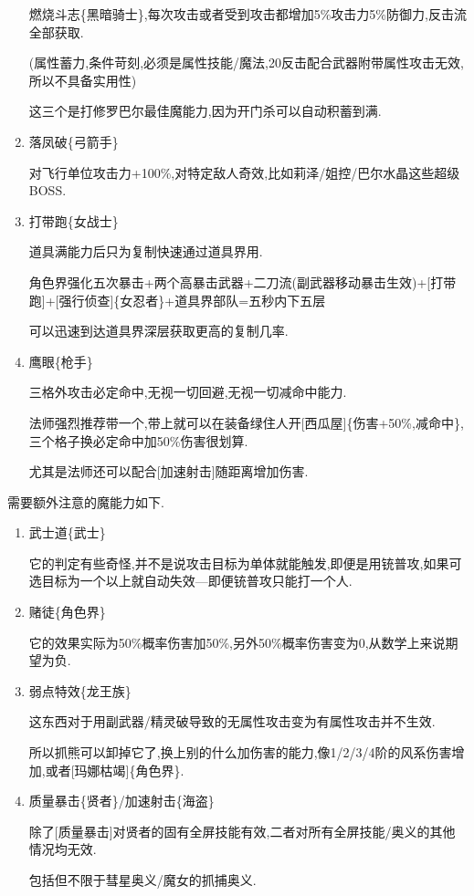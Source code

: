 \begin{enumerate}
		燃烧斗志\{黑暗骑士\},每次攻击或者受到攻击都增加5\%攻击力5\%防御力,反击流全部获取.

		(属性蓄力,条件苛刻,必须是属性技能/魔法,20反击配合武器附带属性攻击无效,所以不具备实用性)

		这三个是打修罗巴尔最佳魔能力,因为开门杀可以自动积蓄到满.

		\item
		落凤破\{弓箭手\}

		对飞行单位攻击力+100\%,对特定敌人奇效,比如莉泽/姐控/巴尔水晶这些超级BOSS.

		\item
		打带跑\{女战士\}

		道具满能力后只为复制快速通过道具界用.

		角色界强化五次暴击+两个高暴击武器+二刀流(副武器移动暴击生效)+[打带跑]+[强行侦查]\{女忍者\}+道具界部队=五秒内下五层

		可以迅速到达道具界深层获取更高的复制几率.

		\item
		鹰眼\{枪手\}

		三格外攻击必定命中,无视一切回避,无视一切减命中能力.

		法师强烈推荐带一个,带上就可以在装备绿住人开[西瓜屋]\{伤害+50\%,减命中\},三个格子换必定命中加50\%伤害很划算.

		尤其是法师还可以配合[加速射击]随距离增加伤害.



	\end{enumerate}

	需要额外注意的魔能力如下.

	\begin{enumerate}

		\item
		武士道\{武士\}

		它的判定有些奇怪,并不是说攻击目标为单体就能触发,即便是用铳普攻,如果可选目标为一个以上就自动失效---即便铳普攻只能打一个人.

		\item
		赌徒\{角色界\}

		它的效果实际为50\%概率伤害加50\%,另外50\%概率伤害变为0,从数学上来说期望为负.

		\item
		弱点特效\{龙王族\}

		这东西对于用副武器/精灵破导致的无属性攻击变为有属性攻击并不生效.

		所以抓熊可以卸掉它了,换上别的什么加伤害的能力,像1/2/3/4阶的风系伤害增加,或者[玛娜枯竭]\{角色界\}.

		\item
		质量暴击\{贤者\}/加速射击\{海盗\}

		除了[质量暴击]对贤者的固有全屏技能有效,二者对所有全屏技能/奥义的其他情况均无效.

		包括但不限于彗星奥义/魔女的抓捕奥义.

	\end{enumerate}
	

